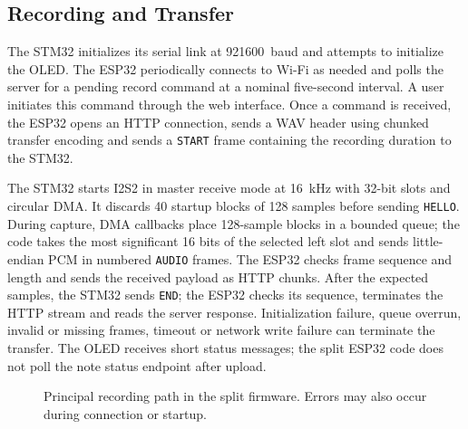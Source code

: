 \subsection{Recording and Transfer}
The STM32 initializes its serial link at 921600~baud and attempts to initialize the OLED. The ESP32 periodically connects to Wi-Fi as needed and polls the server for a pending record command at a nominal five-second interval. A user initiates this command through the web interface. Once a command is received, the ESP32 opens an HTTP connection, sends a WAV header using chunked transfer encoding and sends a \texttt{START} frame containing the recording duration to the STM32.

The STM32 starts I2S2 in master receive mode at 16~kHz with 32-bit slots and circular DMA. It discards 40 startup blocks of 128 samples before sending \texttt{HELLO}. During capture, DMA callbacks place 128-sample blocks in a bounded queue; the code takes the most significant 16 bits of the selected left slot and sends little-endian PCM in numbered \texttt{AUDIO} frames. The ESP32 checks frame sequence and length and sends the received payload as HTTP chunks. After the expected samples, the STM32 sends \texttt{END}; the ESP32 checks its sequence, terminates the HTTP stream and reads the server response. Initialization failure, queue overrun, invalid or missing frames, timeout or network write failure can terminate the transfer. The OLED receives short status messages; the split ESP32 code does not poll the note status endpoint after upload.

\begin{figure}[htbp]
\centering
{}
\caption{Principal recording path in the split firmware. Errors may also occur during connection or startup.}
\label{fig:record-flow}
\end{figure}

